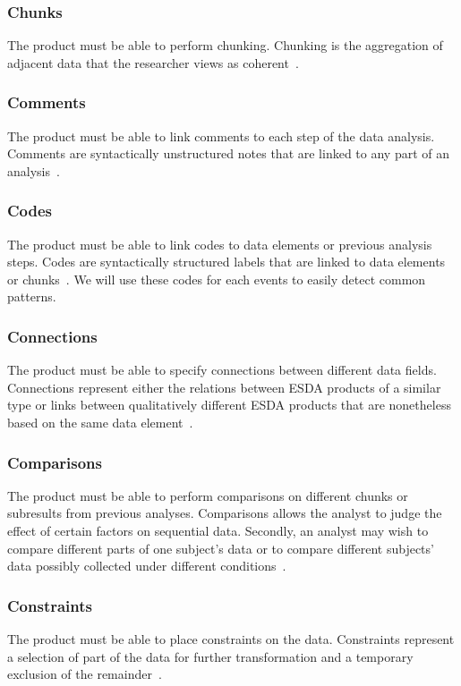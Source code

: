 \documentclass[11pt,twoside,a4paper]{article}
\begin{document}
\subsubsection{Chunks}
The product must be able to perform chunking. Chunking is the aggregation of adjacent data that the researcher views as coherent~\autocite{SeqAnalysis}. 

\subsubsection{Comments}
The product must be able to link comments to each step of the data analysis. Comments are syntactically unstructured notes that are linked to any part of an analysis~\autocite{SeqAnalysis}.

\subsubsection{Codes}
The product must be able to link codes to data elements or previous analysis steps. Codes are syntactically structured labels that are linked to data elements or chunks~\autocite{SeqAnalysis}. We will use these codes for each events to easily detect common patterns.

\subsubsection{Connections}
The product must be able to specify connections between different data fields. Connections represent either the relations between ESDA products of a similar type or links between qualitatively different ESDA products that are nonetheless based on the same data element~\autocite{SeqAnalysis}.

\subsubsection{Comparisons}
The product must be able to perform comparisons on different chunks or subresults from previous analyses. Comparisons allows the analyst to judge the effect of certain factors on sequential data. Secondly, an analyst may wish to compare different parts of one subject’s data or to compare different subjects’ data possibly collected under different conditions~\autocite{SeqAnalysis}.

\subsubsection{Constraints}
The product must be able to place constraints on the data. Constraints represent a selection of part of the data for further transformation and a temporary exclusion of the remainder~\autocite{SeqAnalysis}. 
\end{document}
